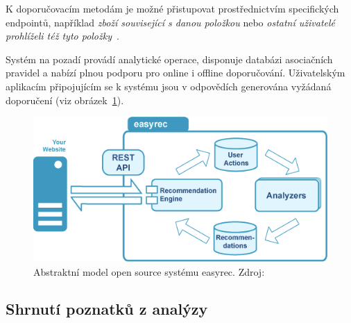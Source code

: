 \documentclass[thesis=M,czech]{FITthesis}[2014/05/07]
\begin{document}
K doporučovacím metodám je možné přistupovat prostřednictvím specifických endpointů, například \emph{zboží související s danou položkou} nebo \emph{ostatní uživatelé prohlíželi též tyto položky}~\cite{ibm}. 

Systém na pozadí provádí analytické operace, disponuje databázi asociačních pravidel a nabízí plnou podporu pro online i offline doporučování. Uživatelským aplikacím připojujícím se k systému jsou v odpovědích generována vyžádaná doporučení (viz obrázek~\ref{fig:easyrec}).

\begin{figure}\centering
	\includegraphics[width=1.0\textwidth]{obr/easyrec.png}
 	\caption[Abstraktní model open source systému easyrec]{Abstraktní model open source systému easyrec. Zdroj: \cite{easyrec}}\label{fig:easyrec}
\end{figure}	

\subsection{Shrnutí poznatků z analýzy}  
\end{document}
